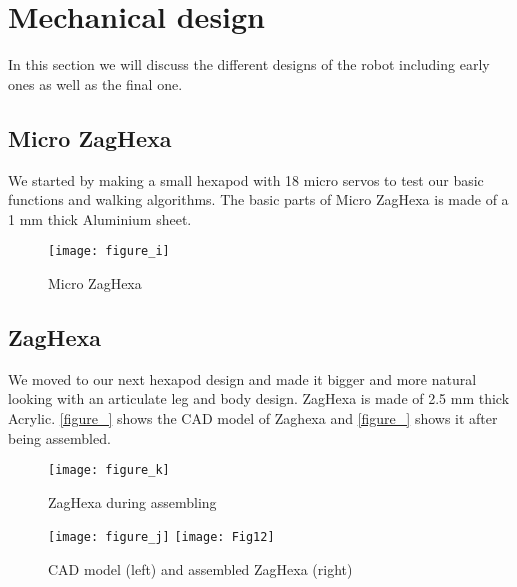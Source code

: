 \section{Mechanical design}
In this section we will discuss the different designs of the robot including early ones as well as the final one.

\subsection{Micro ZagHexa}
We started by making a small hexapod with 18 micro servos to test our basic functions and walking algorithms. The basic parts of Micro ZagHexa is made of a 1 mm thick Aluminium sheet.

\begin{figure}[h]
	\centering
	\texttt{[image: figure\_i]}
	\caption{Micro ZagHexa}
	\label{figure_i}
\end{figure}

\subsection{ZagHexa}
We moved to our next hexapod design and made it bigger and more natural looking with an articulate leg and body design. ZagHexa is made of 2.5 mm thick Acrylic. \ref{figure_} shows the CAD model of Zaghexa and \ref{figure_} shows it after being assembled.
\begin{figure}[h]
	\centering
	\texttt{[image: figure\_k]}
	\caption{ZagHexa during assembling}
	\label{figure_k}
\end{figure}
\begin{figure}[h]
	\centering
   \texttt{[image: figure\_j]}
	\texttt{[image: Fig12]}
	\caption{CAD model (left) and assembled ZagHexa (right)}
	\label{figure_l}
\end{figure}

